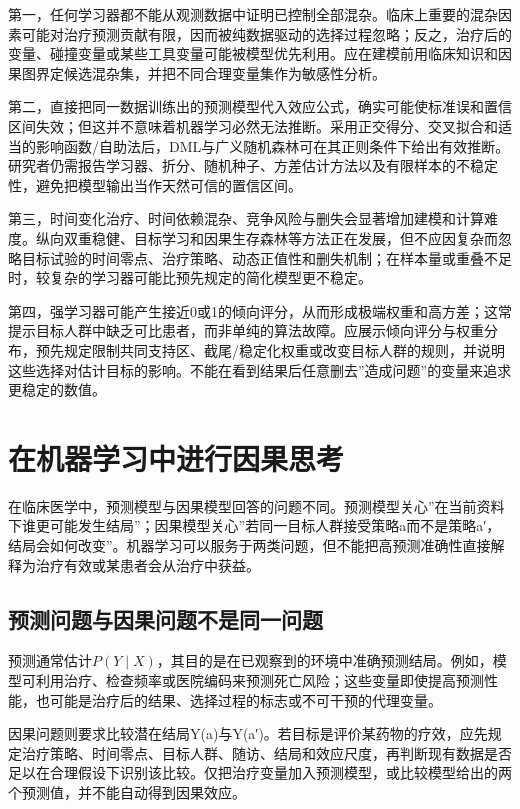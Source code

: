 \documentclass[
  chinese-hans,
  letterpaper,
  DIV=11,
  numbers=noendperiod]{scrreprt}
\begin{document}
第一，任何学习器都不能从观测数据中证明已控制全部混杂。临床上重要的混杂因素可能对治疗预测贡献有限，因而被纯数据驱动的选择过程忽略；反之，治疗后的变量、碰撞变量或某些工具变量可能被模型优先利用。应在建模前用临床知识和因果图界定候选混杂集，并把不同合理变量集作为敏感性分析。

第二，直接把同一数据训练出的预测模型代入效应公式，确实可能使标准误和置信区间失效；但这并不意味着机器学习必然无法推断。采用正交得分、交叉拟合和适当的影响函数/自助法后，DML与广义随机森林可在其正则条件下给出有效推断。研究者仍需报告学习器、折分、随机种子、方差估计方法以及有限样本的不稳定性，避免把模型输出当作天然可信的置信区间。

第三，时间变化治疗、时间依赖混杂、竞争风险与删失会显著增加建模和计算难度。纵向双重稳健、目标学习和因果生存森林等方法正在发展，但不应因复杂而忽略目标试验的时间零点、治疗策略、动态正值性和删失机制；在样本量或重叠不足时，较复杂的学习器可能比预先规定的简化模型更不稳定。

第四，强学习器可能产生接近0或1的倾向评分，从而形成极端权重和高方差；这常提示目标人群中缺乏可比患者，而非单纯的算法故障。应展示倾向评分与权重分布，预先规定限制共同支持区、截尾/稳定化权重或改变目标人群的规则，并说明这些选择对估计目标的影响。不能在看到结果后任意删去''造成问题''的变量来追求更稳定的数值。

\section{在机器学习中进行因果思考}\label{ux5728ux673aux5668ux5b66ux4e60ux4e2dux8fdbux884cux56e0ux679cux601dux8003}

在临床医学中，预测模型与因果模型回答的问题不同。预测模型关心''在当前资料下谁更可能发生结局''；因果模型关心''若同一目标人群接受策略a而不是策略a′，结局会如何改变''。机器学习可以服务于两类问题，但不能把高预测准确性直接解释为治疗有效或某患者会从治疗中获益。

\subsection{预测问题与因果问题不是同一问题}\label{ux9884ux6d4bux95eeux9898ux4e0eux56e0ux679cux95eeux9898ux4e0dux662fux540cux4e00ux95eeux9898}

预测通常估计\(P(Y\mid X)\)，其目的是在已观察到的环境中准确预测结局。例如，模型可利用治疗、检查频率或医院编码来预测死亡风险；这些变量即使提高预测性能，也可能是治疗后的结果、选择过程的标志或不可干预的代理变量。

因果问题则要求比较潜在结局Y(a)与Y(a′)。若目标是评价某药物的疗效，应先规定治疗策略、时间零点、目标人群、随访、结局和效应尺度，再判断现有数据是否足以在合理假设下识别该比较。仅把治疗变量加入预测模型，或比较模型给出的两个预测值，并不能自动得到因果效应。
\end{document}
